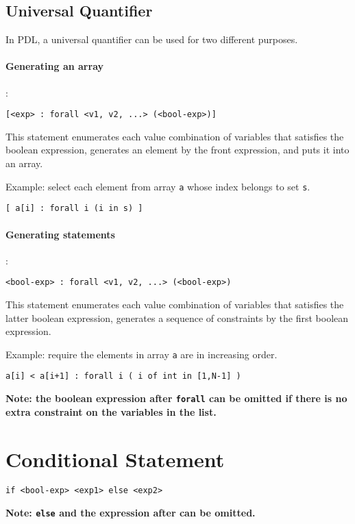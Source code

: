\documentclass{report}
\begin{document}
\subsection{Universal Quantifier}

In PDL, a universal quantifier can be used for two different purposes.

\paragraph{Generating an array}:
\begin{lstlisting}
[<exp> : forall <v1, v2, ...> (<bool-exp>)]
\end{lstlisting}
This statement enumerates each value combination of variables that satisfies the boolean expression, generates an element by the front expression, and puts it into an array.

Example: select each element from array \texttt{a} whose index belongs to set \texttt{s}.
\begin{lstlisting}
[ a[i] : forall i (i in s) ]
\end{lstlisting}

\paragraph{Generating statements}:
\begin{lstlisting}
<bool-exp> : forall <v1, v2, ...> (<bool-exp>)
\end{lstlisting}
This statement enumerates each value combination of variables that satisfies the latter boolean expression, generates a sequence of constraints by the first boolean expression.

Example: require the elements in array \texttt{a} are in increasing order.
\begin{lstlisting}
a[i] < a[i+1] : forall i ( i of int in [1,N-1] )
\end{lstlisting}
\textbf{Note: the boolean expression after \texttt{forall} can be omitted if there is no extra constraint on the variables in the list.}

\section{Conditional Statement}

\begin{lstlisting}
if <bool-exp> <exp1> else <exp2>
\end{lstlisting}
\textbf{Note: \texttt{else} and the expression after can be omitted.}
\end{document}

